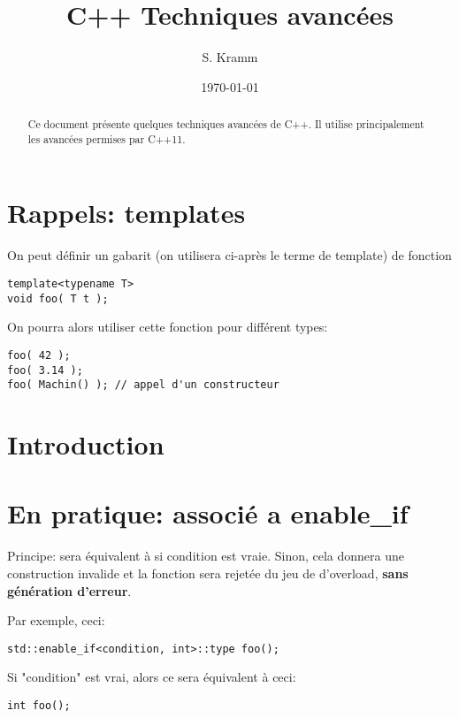 \documentclass[11pt,a4paper]{article}
\author{S. Kramm}
\title{C++ Techniques avancées}
\date{\today}
\begin{document}
\maketitle

\begin{abstract}
Ce document présente quelques techniques avancées de C++.
Il utilise principalement les avancées permises par C++11.
\end{abstract}

\section{Rappels: templates}

On peut définir un gabarit (on utilisera ci-après le terme de template) de fonction

\begin{lstlisting}
template<typename T>
void foo( T t );
\end{lstlisting}

On pourra alors utiliser cette fonction pour différent types:
\begin{lstlisting}
foo( 42 );
foo( 3.14 );
foo( Machin() ); // appel d'un constructeur
\end{lstlisting}





\section{Introduction}



\section{En pratique: associé a enable\_if}

Principe:  sera équivalent à  si condition est vraie.
Sinon, cela donnera une construction invalide et la fonction sera rejetée du jeu de d'overload, {\bf sans génération d'erreur}.

Par exemple, ceci:
\begin{lstlisting}
std::enable_if<condition, int>::type foo();
\end{lstlisting}
Si "condition" est vrai, alors ce sera équivalent à ceci:
\begin{lstlisting}
int foo();
\end{lstlisting}
\end{document}
